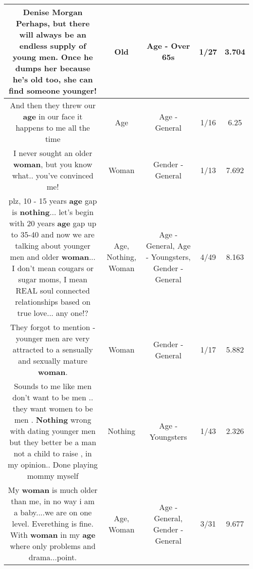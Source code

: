 \documentclass[11pt]{article}
\newlength\mylength
\begin{document}
\begin{center}
\begin{longtable}{|C{.65\mylength}|C{.30\mylength}|C{.12\mylength}|C{.12\mylength}|C{.12\mylength}|}
  \small Denise Morgan Perhaps, but there will always be an endless supply of young men. Once he dumps her because he's \textbf{old} too, she can find someone younger!\normalsize   & Old & Age - Over 65s & 1/27 & 3.704 \\  \hline
  \small And then they threw our \textbf{age} in our face it happens to me all the time\normalsize   & Age & Age - General & 1/16 & 6.25 \\  \hline
  \small I never sought an older \textbf{woman}, but you know what.. you've convinced me!\normalsize   & Woman & Gender - General & 1/13 & 7.692 \\  \hline
  \small plz, 10 - 15 years \textbf{age} gap is \textbf{nothing}... let's begin with 20 years \textbf{age} gap up to 35-40 and now we are talking about younger men and older \textbf{woman}... I don't mean cougars or sugar moms, I mean REAL soul connected relationships based on true love... any one!?\normalsize   & Age, Nothing, Woman & Age - General, Age - Youngsters, Gender - General & 4/49 & 8.163 \\  \hline
  \small They forgot to mention - younger men are very attracted to a sensually and sexually mature \textbf{woman}.\normalsize   & Woman & Gender - General & 1/17 & 5.882 \\  \hline
  \small Sounds to me like men don't want to be men .. they want women to be men . \textbf{Nothing} wrong with dating younger men but they better be a man not a child to raise , in my opinion.. Done playing mommy myself\normalsize   & Nothing & Age - Youngsters & 1/43 & 2.326 \\  \hline
  \small My \textbf{woman} is much older than me, in no way i am a baby....we are on one level. Everething is fine. With \textbf{woman} in my \textbf{age} where only problems and drama...point.\normalsize   & Age, Woman & Age - General, Gender - General & 3/31 & 9.677 \\  \hline

\end{longtable}
\end{center}
\end{document}
